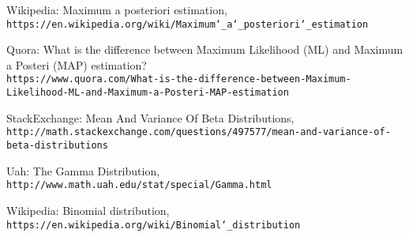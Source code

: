 \documentclass[11pt, oneside]{article}
\begin{document}
\begin{thebibliography}{9}
Wikipedia: Maximum a posteriori estimation,
\\\texttt{https://en.wikipedia.org/wiki/Maximum\char`_a\char`_posteriori\char`_estimation}

Quora: What is the difference between Maximum Likelihood (ML) and Maximum a Posteri (MAP) estimation?
\\\texttt{https://www.quora.com/What-is-the-difference-between-Maximum-Likelihood-ML-and-Maximum-a-Posteri-MAP-estimation}

StackExchange: Mean And Variance Of Beta Distributions,
\\\texttt{http://math.stackexchange.com/questions/497577/mean-and-variance-of-beta-distributions}

Uah: The Gamma Distribution,
\\\texttt{http://www.math.uah.edu/stat/special/Gamma.html}

Wikipedia: Binomial distribution,
\\\texttt{https://en.wikipedia.org/wiki/Binomial\char`_distribution}

\end{thebibliography}
\end{document}
